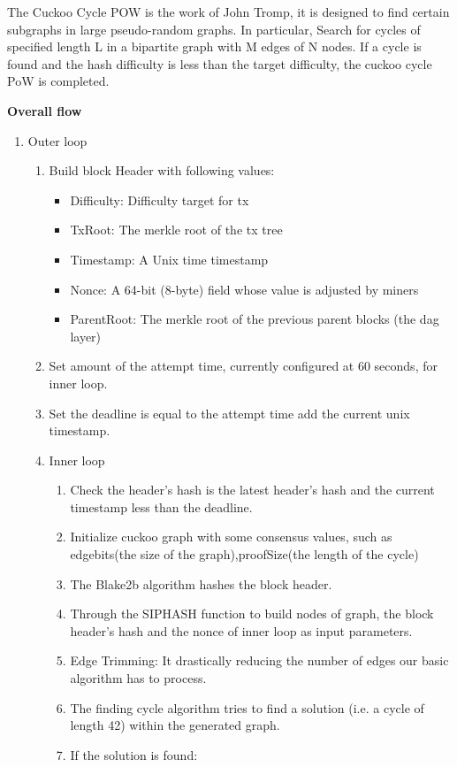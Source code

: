 \documentclass[a4paper,11pt]{article}
\begin{document}
The Cuckoo Cycle POW is the work of John Tromp, it is designed to find certain subgraphs in large pseudo-random graphs. In particular, Search for cycles of specified length L in a bipartite graph with M edges of N nodes. If a cycle is found and the hash difficulty is less than the target difficulty, the cuckoo cycle PoW is completed.


\textbf{Overall flow}

\begin{enumerate}
	
\item Outer loop

\begin{enumerate}
	\item Build block Header with following values:
	
		\begin{itemize}
		\item Difficulty: Difficulty target for tx
		\item TxRoot: The merkle root of the tx tree
		\item Timestamp: A Unix time timestamp
		\item Nonce: A 64-bit (8-byte) field whose value is adjusted by miners
		\item ParentRoot: The merkle root of the previous parent blocks (the dag layer)
		\end{itemize}
	
	\item Set amount of the attempt time, currently configured at 60 seconds, for inner loop.
	\item Set the deadline is equal to the attempt time add the current unix timestamp.
	\item Inner loop
	
		\begin{enumerate}
			\item Check the header’s hash is the latest header’s hash and the current timestamp less than the deadline.
			\item Initialize cuckoo graph with some consensus values, such as edgebits(the size of the graph),proofSize(the length of the cycle)
			\item The Blake2b algorithm hashes the block header.
			\item Through the SIPHASH function to build nodes of graph, the block header’s hash and the nonce of inner loop as input parameters.
			\item Edge Trimming: It drastically reducing the number of edges our basic algorithm has to process.
			\item The finding cycle algorithm tries to find a solution (i.e. a cycle of length 42) within the generated graph.
			\item If the solution is found:
			

\end{enumerate}
\end{enumerate}
\end{enumerate}
\end{document}
